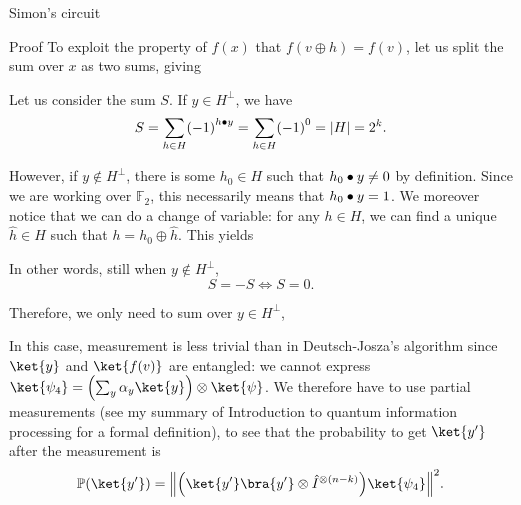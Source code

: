 \documentclass[a4paper]{article}
\begin{document}
\begin{parag}{Simon's circuit}
\begin{subparag}{Proof}
        To exploit the property of $f\left(x\right)$ that $f\left(v \oplus h\right) = f\left(v\right)$, let us split the sum over $x$ as two sums, giving 
        
        Let us consider the sum $S$. If $y \in H^{\perp}$, we have 
        \[S = \sum_{h \in H} \left(-1\right)^{h \dotprod y} = \sum_{h \in H} \left(-1\right)^{0} = \left|H\right| = 2^k.\]

        However, if $y \not \in H^{\perp}$, there is some $h_0 \in H$ such that $h_0 \bullet y \neq 0$ by definition. Since we are working over $\mathbb{F}_2$, this necessarily means that $h_0 \bullet y = 1$. We moreover notice that we can do a change of variable: for any $h \in H$, we can find a unique $\hat{h} \in H$ such that $h = h_0 \oplus \hat{h}$. This yields

        In other words, still when $y \not \in H^{\perp}$,
        \[S = -S \iff S = 0.\]
        
        Therefore, we only need to sum over $y \in H^{\perp}$,

        In this case, measurement is less trivial than in Deutsch-Josza's algorithm since $\ket{y}$ and $\ket{f\left(v\right)}$ are entangled: we cannot express $\ket{\psi_4} = \left(\sum_{y} \alpha_y \ket{y}\right) \otimes \ket{\psi}$. We therefore have to use partial measurements (see my summary of Introduction to quantum information processing for a formal definition), to see that the probability to get $\ket{y'}$ after the measurement is
        \[\prob\left(\ket{y'}\right) = \left\|\left(\ket{y'}\bra{y'} \otimes \hat{I}^{\otimes \left(n-k\right)}\right) \ket{\psi_4}\right\|^2.\]


\end{subparag}
\end{parag}
\end{document}
